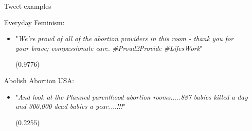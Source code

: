 \documentclass[notheorems,12pt]{beamer}
\begin{document}
\begin{frame}

\end{frame}
\begin{frame}{Tweet examples}
    \begin{block}{Everyday Feminism:}
        \begin{itemize}
            \item \begin{footnotesize} "\textit{We're proud of all of the abortion providers in this room - thank you for your brave; compassionate care. \#Proud2Provide \#LifesWork}" \end{footnotesize} (0.9776)
        \end{itemize}
    \end{block}
    \begin{block}{Abolish Abortion USA:}
        \begin{itemize}
            \item \begin{footnotesize} "\textit{And look at the Planned parenthood abortion rooms.....887 babies killed a day and 300,000 dead babies a year....!!!}" \end{footnotesize} (0.2255)
        \end{itemize}
    \end{block}
\end{frame}
\end{document}
